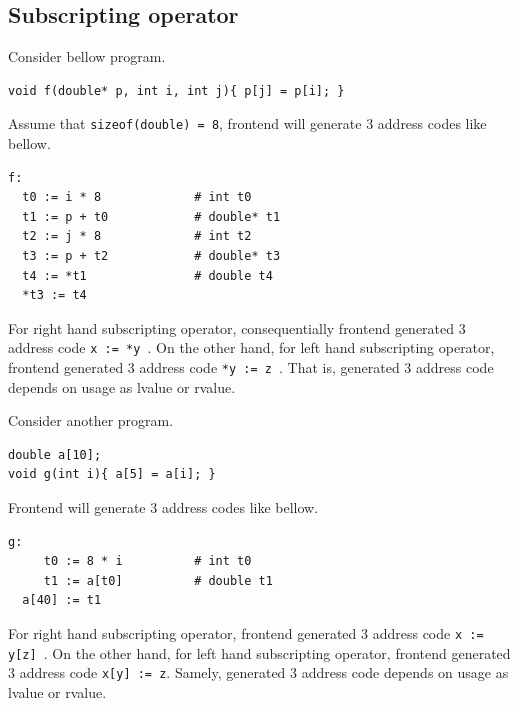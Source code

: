 \subsection{Subscripting operator}
\label{expr_e017}

Consider bellow program.
\begin{verbatim}
void f(double* p, int i, int j){ p[j] = p[i]; }
\end{verbatim}
Assume that {\tt{sizeof(double) = 8}},
frontend will generate 3 address codes like bellow.
\begin{verbatim}
f:
  t0 := i * 8             # int t0
  t1 := p + t0            # double* t1
  t2 := j * 8             # int t2
  t3 := p + t2            # double* t3
  t4 := *t1               # double t4
  *t3 := t4
\end{verbatim}
For right hand subscripting operator, 
consequentially frontend generated 3 address code {\tt{x := *y }}.
On the other hand, for left hand subscripting operator,
frontend generated 3 address code {\tt{*y := z }}.
That is, generated 3 address code depends on usage as lvalue or rvalue.

Consider another program.
\begin{verbatim}
double a[10];
void g(int i){ a[5] = a[i]; }
\end{verbatim}
Frontend will generate 3 address codes like bellow.
\begin{verbatim}
g:
     t0 := 8 * i          # int t0
     t1 := a[t0]          # double t1
  a[40] := t1
\end{verbatim}
For right hand subscripting operator, 
frontend generated 3 address code {\tt{x := y[z] }}.
On the other hand, for left hand subscripting operator,
frontend generated 3 address code {\tt{x[y] := z}}.
Samely, generated 3 address code depends on usage as lvalue or rvalue.

